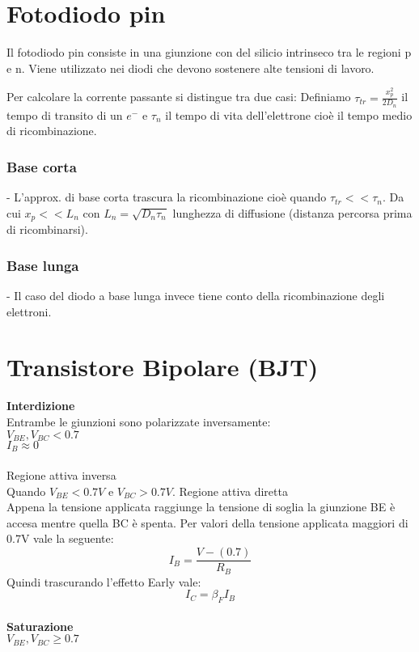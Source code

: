 \documentclass{article}
\begin{document}
\section*{Fotodiodo pin}
Il fotodiodo pin consiste in una giunzione con del silicio intrinseco tra le regioni p e n. Viene utilizzato nei diodi che devono sostenere alte tensioni di lavoro.

Per calcolare la corrente passante si distingue tra due casi:
Definiamo $\tau_{tr} = \frac{x_p^2}{2D_n}$ il tempo di transito di un $e^{-}$ e $\tau_n$ il tempo di vita dell'elettrone cioè il tempo medio di ricombinazione.\\
\subsubsection*{Base corta}
- L'approx. di base corta trascura la ricombinazione cioè quando $\tau_{tr}<<\tau_n$. Da cui $x_p<<L_n$ con $L_n = \sqrt{D_n \tau_n}$ lunghezza di diffusione (distanza percorsa prima di ricombinarsi).
\subsubsection*{Base lunga}
- Il caso del diodo a base lunga invece tiene conto della ricombinazione degli elettroni.

\section*{Transistore Bipolare (BJT)}
\textbf{Interdizione}\\
Entrambe le giunzioni sono polarizzate inversamente:\\
\hspace*{2cm} $V_{BE}, V_{BC} < 0.7$\\
\hspace*{2cm} $I_B \approx 0$\\
\\
Regione attiva inversa\\
Quando $V_{BE} < 0.7V$ e $V_{BC} > 0.7V$.
Regione attiva diretta\\
Appena la tensione applicata raggiunge la tensione di soglia la giunzione BE è accesa mentre quella BC è spenta. Per valori della tensione applicata maggiori di 0.7V vale la seguente:
\begin{equation*}
I_B = \frac{V - (0.7)}{R_B}
\end{equation*}
Quindi trascurando l'effetto Early vale:
\begin{equation*}
I_C = \beta_F I_B
\end{equation*}
\\
\textbf{Saturazione}\\
\hspace*{2cm} $V_{BE}, V_{BC} \geqslant 0.7$\\
\end{document}
